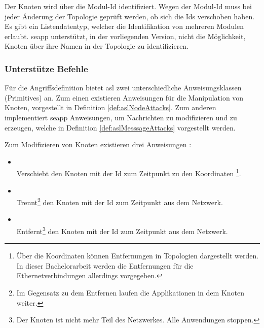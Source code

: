 Der Knoten wird über die Modul-Id identifiziert. Wegen der Modul-Id muss bei jeder Änderung der Topologie geprüft werden, ob sich die Ids verschoben haben. Es gibt ein Listendatentyp, welcher die Identifikation von mehreren Modulen erlaubt. \gls{seapp} unterstützt, in der vorliegenden Version, nicht die Möglichkeit, Knoten über ihre Namen in der Topologie zu identifizieren.

\subsubsection{Unterstütze Befehle}
Für die Angriffsdefinition bietet \gls{asl} zwei unterschiedliche Anweisungsklassen (Primitives) an. Zum einen existieren Anweisungen für die Manipulation von Knoten, vorgestellt in Definition \ref{def:aslNodeAttacks}. Zum anderen implementiert \gls{seapp} Anweisungen, um Nachrichten zu modifizieren und zu erzeugen, welche in Definition \ref{def:aslMesssageAttacks} vorgestellt werden.
\begin{definition}\label{def:aslNodeAttacks}
	Zum Modifizieren von Knoten existieren drei Anweisungen \cite[]{Tiloca2019}:
	\begin{itemize}
		\item {} \hfill \\
		Verschiebt den Knoten mit der Id  zum Zeitpunkt  zu den Koordinaten \footnote{Über die Koordinaten können Entfernungen in Topologien dargestellt werden. In dieser Bachelorarbeit werden die Entfernungen für die Ethernetverbindungen allerdings vorgegeben.}.
		\item {}\hfill \\
		Trennt\footnote{Im Gegensatz zu dem Entfernen laufen die Applikationen in dem Knoten weiter.} den Knoten mit der Id  zum Zeitpunkt  aus dem Netzwerk. 
		\item {}\hfill \\
		Entfernt\footnote{Der Knoten ist nicht mehr Teil des Netzwerkes. Alle Anwendungen stoppen.} den Knoten mit der Id  zum Zeitpunkt  aus dem Netzwerk.
	\end{itemize}
\end{definition} %

